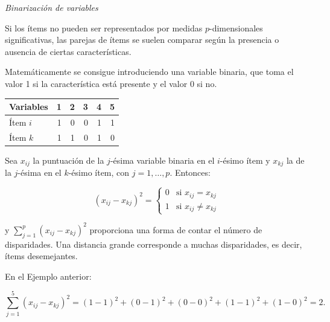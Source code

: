\documentclass[spanish]{beamer}
\begin{document}
\begin{frame}{\textit{Binarización de variables}}

Si los ítems no pueden ser representados por medidas $p$-dimensionales significativas, las parejas de ítems se suelen comparar según la presencia o ausencia de ciertas características.\break

Matemáticamente se consigue introduciendo una variable binaria, que toma el valor 1 si la característica está presente y el valor 0 si no. 

\begin{table}[h]
\centering
  \begin{tabular}{lrrrrr}
    \toprule
  Variables    & 1    & 2    & 3   & 4   & 5   \\
  \midrule
Ítem $i$ & 1    & 0    & 0   & 1   & 1   \\
Ítem $k$ & 1    & 1    & 0   & 1   & 0\\
\bottomrule
\end{tabular}
\end{table}
\end{frame}

\begin{frame}{}

Sea $x_{ij}$ la puntuación de la $j$-ésima variable binaria en el $i$-ésimo ítem y $x_{kj}$ la de la $j$-ésima en el $k$-ésimo ítem, con $j=1,\dots,p$. Entonces:

$$(x_{ij}-x_{kj})^2 = \left \{ \begin{matrix} 0 & \mbox{si } x_{ij}=x_{kj}
\\ 1 & \mbox{si }x_{ij}\neq x_{kj}\end{matrix}\right.   $$

y $\sum_{j=1}^p{(x_{ij}-x_{kj})^2}$ proporciona una forma de contar el número de disparidades. Una distancia grande corresponde a muchas disparidades, es decir, ítems desemejantes.\break 

En el Ejemplo anterior:

$$\sum_{j=1}^5{(x_{ij}-x_{kj})^2}=(1-1)^2+(0-1)^2+(0-0)^2+(1-1)^2+(1-0)^2=2.$$
\end{frame}
\end{document}
